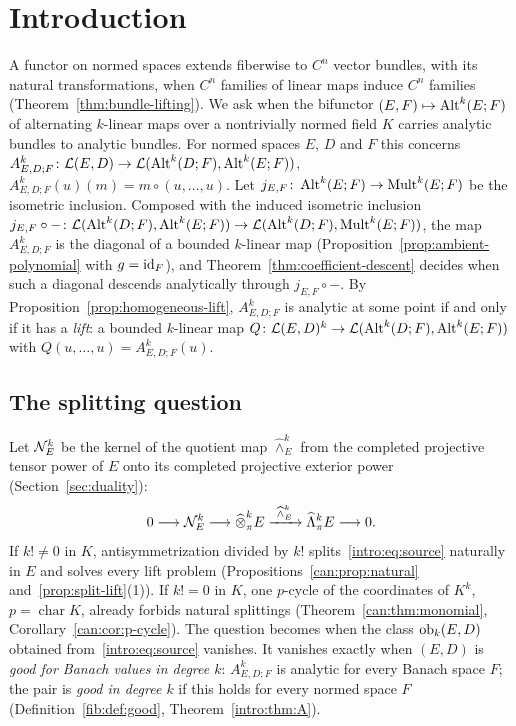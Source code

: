 \section{Introduction}\label{sec:intro}

A functor on normed spaces extends fiberwise to $C^n$ vector bundles, with its natural transformations, when $C^n$
families of linear maps induce $C^n$ families (Theorem~\ref{thm:bundle-lifting}). We ask when the bifunctor
$(E,F)\mapsto\operatorname{Alt}^k(E;F)$ of alternating $k$-linear maps over a nontrivially normed field $K$ carries analytic bundles
to analytic bundles. For normed spaces $E$, $D$ and $F$ this concerns
$A^k_{E,D;F}\colon\mathcal L(E,D)\to\mathcal L(\operatorname{Alt}^k(D;F),\operatorname{Alt}^k(E;F))$, $A^k_{E,D;F}(u)(m)=m\circ(u,\dots,u)$. Let
$j_{E,F}\colon\operatorname{Alt}^k(E;F)\to\operatorname{Mult}^k(E;F)$ be the isometric inclusion. Composed with the induced isometric inclusion
$j_{E,F}\circ{-}\colon\mathcal L(\operatorname{Alt}^k(D;F),\operatorname{Alt}^k(E;F))\to\mathcal L(\operatorname{Alt}^k(D;F),\operatorname{Mult}^k(E;F))$, the map $A^k_{E,D;F}$ is the
diagonal of a bounded $k$-linear map (Proposition~\ref{prop:ambient-polynomial} with $g=\mathrm{id}_F$), and
Theorem~\ref{thm:coefficient-descent} decides when such a diagonal descends analytically through $j_{E,F}\circ{-}$. By Proposition~\ref{prop:homogeneous-lift}, $A^k_{E,D;F}$ is analytic at some
point if and only if it has a \emph{lift}: a bounded $k$-linear map $Q\colon\mathcal L(E,D)^k\to\mathcal L(\operatorname{Alt}^k(D;F),\operatorname{Alt}^k(E;F))$
with $Q(u,\dots,u)=A^k_{E,D;F}(u)$.

\subsection*{The splitting question}
Let $\mathcal N^k_E$ be the kernel of the quotient map $\widehat\wedge^k_E$ from the completed projective tensor power of $E$
onto its completed projective exterior power (Section~\ref{sec:duality}):
\begin{equation}\label{intro:eq:source}
 0\longrightarrow\mathcal N^k_E\longrightarrow\widehat\otimes^k_\pi E\xrightarrow{\ \widehat\wedge^k_E\ }
 \widehat\Lambda^k_\pi E\longrightarrow0.
\end{equation}
If $k!\ne0$ in $K$, antisymmetrization divided by $k!$ splits~\eqref{intro:eq:source} naturally in $E$ and solves every
lift problem (Propositions~\ref{can:prop:natural} and~\ref{prop:split-lift}(1)). If $k!=0$ in $K$, one $p$-cycle of
the coordinates of $K^k$, $p=\operatorname{char}K$, already forbids natural splittings (Theorem~\ref{can:thm:monomial},
Corollary~\ref{can:cor:p-cycle}). The question becomes when
the class $\operatorname{ob}_k(E,D)$ obtained from~\eqref{intro:eq:source} vanishes. It vanishes exactly when $(E,D)$ is \emph{good
for Banach values in degree $k$}: $A^k_{E,D;F}$ is analytic for every Banach space $F$; the pair is \emph{good in
degree $k$} if this holds for every normed space $F$ (Definition~\ref{fib:def:good}, Theorem~\ref{intro:thm:A}).

